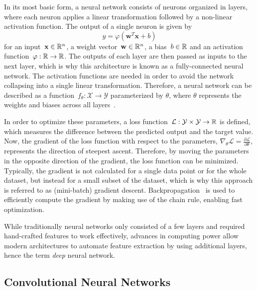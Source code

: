 In its most basic form, a neural network consists of neurons organized in layers, where each neuron
applies a linear transformation followed by a non-linear activation function.
The output of a single neuron is given by
\begin{equation}
    y = \varphi(\mathbf{w}^T\mathbf{x} + b)
\end{equation}
for an input~$\mathbf{x} \in \mathbb{R}^n$, a weight vector~$\mathbf{w} \in \mathbb{R}^n$, a bias~$b \in \mathbb{R}$ and an activation
function~$\varphi: \mathbb{R} \rightarrow \mathbb{R}$.
The outputs of each layer are then passed as inputs to the next layer, which is why this architecture is known as a
fully-connected neural network. 
The activation functions are needed in order to avoid the network collapsing into a single linear transformation. 
Therefore, a neural network can be described as a function~$f_{\theta}: \mathcal{X} \rightarrow \mathcal{Y}$ 
parameterized by $\theta$, where $\theta$ represents the weights and biases across all layers~\cite{DeepLearning}.

In order to optimize these parameters, a loss function~$\mathcal{L}: \mathcal{Y} \times \mathcal{Y} \rightarrow \mathbb{R}$ is 
defined, which measures the difference between the predicted output and the target value. 
Now, the gradient of the loss function with respect to the parameters, 
$\nabla_\theta \mathcal{L} = \frac{\partial \mathcal{L}}{\partial \theta}$, represents the direction of steepest ascent.
Therefore, by moving the parameters in the opposite direction of the gradient, the loss function can be minimized.
Typically, the gradient is not calculated for a single data point or for the whole dataset, but instead for a
small subset of the dataset, which is why this approach is referred to as (mini-batch) gradient descent.
Backpropagation~\cite{Backpropagation} is used to efficiently compute the gradient by making use of the
chain rule, enabling fast optimization.

While traditionally neural networks only consisted of a few layers and required hand-crafted features to work 
effectively, advances in computing power allow modern architectures to automate feature extraction by using additional 
layers, hence the term \textit{deep} neural network.

\subsection{Convolutional Neural Networks}

